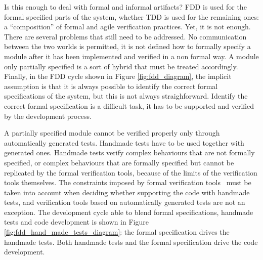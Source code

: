 \documentclass{article}
\begin{document}
Is this enough to deal with formal and informal artifacts?
FDD is used for the formal specified parts of the system, whether TDD is used for the remaining ones: a ``composition'' of formal and agile verification practices.
Yet, it is not enough.
There are several problems that still need to be addressed.
No communication between the two worlds is permitted, it is not defined how to formally specify a module after it has been implemented and verified in a non formal way.
A module only partially specified is a sort of hybrid that must be treated accordingly.
Finally, in the FDD cycle shown in Figure \ref{fig:fdd_diagram}, the implicit assumption is that it is always possible to identify the correct formal specifications of the system, but this is not always straighforward.
Identify the correct formal specification is a difficult task, it has to be supported and verified by the development process.

A partially specified module cannot be verified properly only through automatically generated tests.
Handmade tests have to be used together with generated ones.
Handmade tests verify complex behaviours that are not formally specified, or complex behaviours that are formally specified but cannot be replicated by the formal verification tools, because of the limits of the verification tools themselves. 
The constraints imposed by formal verification tools~\cite{Glass2002} must be taken into account when deciding whether supporting the code with handmade tests, and verification tools based on automatically generated tests are not an exception.
The development cycle able to blend formal specifications, handmade tests and code development is shown in Figure \ref{fig:fdd_hand_made_tests_diagram}: the formal specification drives the handmade tests. 
Both handmade tests and the formal specification drive the code development.
\end{document}
